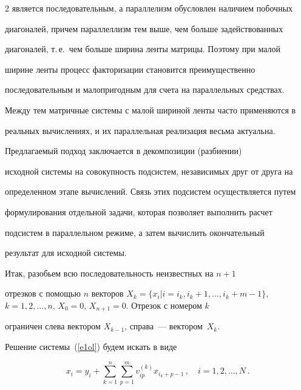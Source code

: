 \begin{multicols}{2}
является последовательным, а параллелизм обусловлен наличием побочных


диагоналей, причем параллеллизм тем выше, чем больше задействованных


диагоналей, т.\,е.\ чем больше ширина ленты матрицы. Поэтому при малой


ширине ленты процесс факторизации становится преимущественно


последовательным и малопригодным для счета на параллельных средствах.


Между тем матричные системы с малой шириной ленты часто применяются в


реальных вычислениях, и их параллельная реализация весьма актуальна.





     Предлагаемый подход заключается в декомпозиции (разбиении)


исходной системы на совокупность подсистем, независимых друг от друга на


определенном этапе вычислений. Связь этих подсистем осуществляется путем


формулирования отдельной задачи, которая позволяет выполнить расчет


подсистем в параллельном режиме, а затем вычислить окончательный


результат для исходной сис\-те\-мы.





     


     Итак, разобьем всю последовательность неизвестных на $n + 1$


отрезков с помощью $n$ векторов $X_k = \{ x_i | i = i_k, i_k + 1,\ldots , i_k + m -


1\}$,  $k = 1, 2,\ldots , n$, $X_0 = 0$, $X_{n+1} = 0$. Отрезок с номером $k$


ограничен слева вектором $X_{k-1}$, справа~--- вектором~$X_k$.








     Решение системы~(\ref{e1ol}) будем искать в виде


     \begin{equation}


        x_i = y_i +\sum\limits_{k=1}^n\sum\limits_{p=1}^m v_{ip}^{(k)}


x_{i_k+p-1}\,,\quad i=1, 2, \ldots , N\,.



\end{equation}
\end{multicols}
